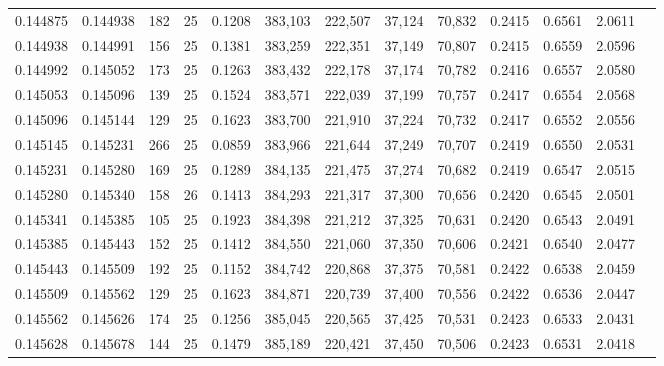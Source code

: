 \begin{tabular}{rrrrrrrrrrrrr}
0.144875 & 0.144938 &   182 &  25 &                                     0.1208 & 383,103 & 222,507 &  37,124 &  70,832 & 0.2415 & 0.6561 & 2.0611 \\
0.144938 & 0.144991 &   156 &  25 &                                     0.1381 & 383,259 & 222,351 &  37,149 &  70,807 & 0.2415 & 0.6559 & 2.0596 \\
0.144992 & 0.145052 &   173 &  25 &                                     0.1263 & 383,432 & 222,178 &  37,174 &  70,782 & 0.2416 & 0.6557 & 2.0580 \\
0.145053 & 0.145096 &   139 &  25 &                                     0.1524 & 383,571 & 222,039 &  37,199 &  70,757 & 0.2417 & 0.6554 & 2.0568 \\
0.145096 & 0.145144 &   129 &  25 &                                     0.1623 & 383,700 & 221,910 &  37,224 &  70,732 & 0.2417 & 0.6552 & 2.0556 \\
0.145145 & 0.145231 &   266 &  25 &                                     0.0859 & 383,966 & 221,644 &  37,249 &  70,707 & 0.2419 & 0.6550 & 2.0531 \\
0.145231 & 0.145280 &   169 &  25 &                                     0.1289 & 384,135 & 221,475 &  37,274 &  70,682 & 0.2419 & 0.6547 & 2.0515 \\
0.145280 & 0.145340 &   158 &  26 &                                     0.1413 & 384,293 & 221,317 &  37,300 &  70,656 & 0.2420 & 0.6545 & 2.0501 \\
0.145341 & 0.145385 &   105 &  25 &                                     0.1923 & 384,398 & 221,212 &  37,325 &  70,631 & 0.2420 & 0.6543 & 2.0491 \\
0.145385 & 0.145443 &   152 &  25 &                                     0.1412 & 384,550 & 221,060 &  37,350 &  70,606 & 0.2421 & 0.6540 & 2.0477 \\
0.145443 & 0.145509 &   192 &  25 &                                     0.1152 & 384,742 & 220,868 &  37,375 &  70,581 & 0.2422 & 0.6538 & 2.0459 \\
0.145509 & 0.145562 &   129 &  25 &                                     0.1623 & 384,871 & 220,739 &  37,400 &  70,556 & 0.2422 & 0.6536 & 2.0447 \\
0.145562 & 0.145626 &   174 &  25 &                                     0.1256 & 385,045 & 220,565 &  37,425 &  70,531 & 0.2423 & 0.6533 & 2.0431 \\
0.145628 & 0.145678 &   144 &  25 &                                     0.1479 & 385,189 & 220,421 &  37,450 &  70,506 & 0.2423 & 0.6531 & 2.0418 \\

\end{tabular}
